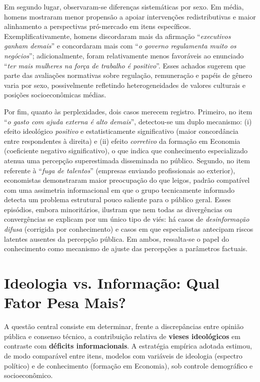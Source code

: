 Em segundo lugar, observaram-se diferenças sistemáticas por sexo. Em média, homens mostraram menor propensão a apoiar intervenções redistributivas e maior alinhamento a perspectivas pró-mercado em itens específicos. Exemplificativamente, homens discordaram mais da afirmação ``\textit{executivos ganham demais}'' e concordaram mais com ``\textit{o governo regulamenta muito os negócios}''; adicionalmente, foram relativamente menos favoráveis ao enunciado ``\textit{ter mais mulheres na força de trabalho é positivo}''. Esses achados sugerem que parte das avaliações normativas sobre regulação, remuneração e papéis de gênero varia por sexo, possivelmente refletindo heterogeneidades de valores culturais e posições socioeconômicas médias.

Por fim, quanto às perplexidades, dois casos merecem registro. Primeiro, no item ``\textit{o gasto com ajuda externa é alto demais}'', detectou-se um duplo mecanismo: (i) efeito ideológico \textit{positivo} e estatisticamente significativo (maior concordância entre respondentes à direita) e (ii) efeito \textit{corretivo} da formação em Economia (coeficiente negativo significativo), o que indica que conhecimento especializado atenua uma percepção superestimada disseminada no público. Segundo, no item referente à ``\textit{fuga de talentos}'' (empresas enviando profissionais ao exterior), economistas demonstraram maior preocupação do que leigos, padrão compatível com uma assimetria informacional em que o grupo tecnicamente informado detecta um problema estrutural pouco saliente para o público geral. Esses episódios, embora minoritários, ilustram que nem todas as divergências ou convergências se explicam por um único tipo de viés: há casos de \textit{desinformação difusa} (corrigida por conhecimento) e casos em que especialistas antecipam riscos latentes ausentes da percepção pública. Em ambos, ressalta-se o papel do conhecimento como mecanismo de ajuste das percepções a parâmetros factuais.

\section{Ideologia vs. Informação: Qual Fator Pesa Mais?}

A questão central consiste em determinar, frente a discrepâncias entre opinião pública e consenso técnico, a contribuição relativa de \textbf{vieses ideológicos} em contraste com \textbf{déficits informacionais}. A estratégia empírica adotada estimou, de modo comparável entre itens, modelos com variáveis de ideologia (espectro político) e de conhecimento (formação em Economia), sob controle demográfico e socioeconômico.


